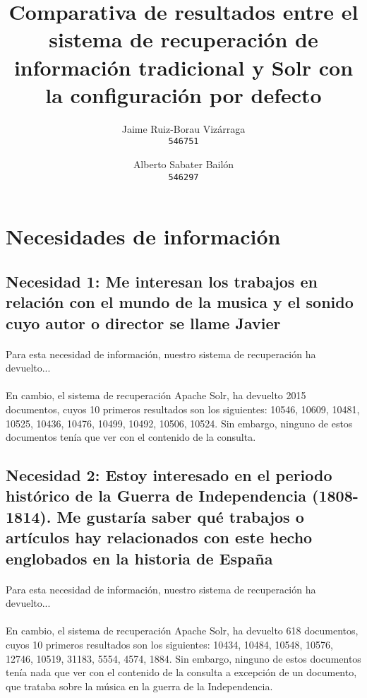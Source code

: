 \documentclass[a4paper]{article}
\begin{document}
\title{Comparativa de resultados entre el sistema de recuperación de información tradicional y Solr con la configuración por defecto}
\author{
	Jaime Ruiz-Borau Vizárraga\\
	\texttt{546751}
	\and
	Alberto Sabater Bailón\\
	\texttt{546297}
	}
\date{}
\maketitle

\section{Necesidades de información}
\subsection{Necesidad 1: Me interesan los trabajos en relación con el mundo de la musica y el sonido cuyo autor o director se llame Javier}
\paragraph{}Para esta necesidad de información, nuestro sistema de recuperación ha devuelto...
\paragraph{}En cambio, el sistema de recuperación Apache Solr, ha devuelto 2015 documentos, cuyos 10 primeros resultados son los siguientes: 10546, 10609, 10481, 10525, 10436, 10476, 10499, 10492, 10506, 10524. Sin embargo, ninguno de estos documentos tenía que ver con el contenido de la consulta.
\subsection{Necesidad 2: Estoy interesado en el periodo histórico de la Guerra de Independencia	(1808-1814). Me gustaría saber qué trabajos o artículos hay relacionados con este hecho englobados en la historia de España}
\paragraph{}Para esta necesidad de información, nuestro sistema de recuperación ha devuelto...
\paragraph{}En cambio, el sistema de recuperación Apache Solr, ha devuelto 618 documentos, cuyos 10 primeros resultados son los siguientes: 10434, 10484, 10548, 10576, 12746, 10519, 31183, 5554, 4574, 1884. Sin embargo, ninguno de estos documentos tenía nada que ver con el contenido de la consulta a excepción de un documento, que trataba sobre la música en la guerra de la Independencia.
\end{document}
